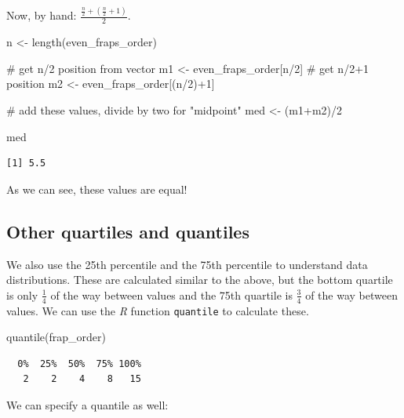 \documentclass[
  letterpaper,
  DIV=11,
  numbers=noendperiod]{scrreprt}
\newenvironment{Shaded}{\begin{snugshade}}{\end{snugshade}}
\newcommand{\CommentTok}[1]{\textcolor[rgb]{0.37,0.37,0.37}{#1}}
\newcommand{\DecValTok}[1]{\textcolor[rgb]{0.68,0.00,0.00}{#1}}
\newcommand{\FunctionTok}[1]{\textcolor[rgb]{0.28,0.35,0.67}{#1}}
\newcommand{\NormalTok}[1]{\textcolor[rgb]{0.00,0.23,0.31}{#1}}
\newcommand{\OtherTok}[1]{\textcolor[rgb]{0.00,0.23,0.31}{#1}}
\newcommand{\SpecialCharTok}[1]{\textcolor[rgb]{0.37,0.37,0.37}{#1}}
\begin{document}
Now, by hand: \(\frac{\frac{n}{2}+(\frac{n}{2}+1)}{2}\).

\begin{Shaded}
\begin{Highlighting}[]
\NormalTok{n }\OtherTok{\textless{}{-}} \FunctionTok{length}\NormalTok{(even\_fraps\_order)}

\CommentTok{\# get n/2 position from vector}
\NormalTok{m1 }\OtherTok{\textless{}{-}}\NormalTok{ even\_fraps\_order[n}\SpecialCharTok{/}\DecValTok{2}\NormalTok{]}
\CommentTok{\# get n/2+1 position}
\NormalTok{m2 }\OtherTok{\textless{}{-}}\NormalTok{ even\_fraps\_order[(n}\SpecialCharTok{/}\DecValTok{2}\NormalTok{)}\SpecialCharTok{+}\DecValTok{1}\NormalTok{]}

\CommentTok{\# add these values, divide by two for "midpoint"}
\NormalTok{med }\OtherTok{\textless{}{-}}\NormalTok{ (m1}\SpecialCharTok{+}\NormalTok{m2)}\SpecialCharTok{/}\DecValTok{2}

\NormalTok{med}
\end{Highlighting}
\end{Shaded}

\begin{verbatim}
[1] 5.5
\end{verbatim}

As we can see, these values are equal!

\subsection{Other quartiles and
quantiles}\label{other-quartiles-and-quantiles}

We also use the 25th percentile and the 75th percentile to understand
data distributions. These are calculated similar to the above, but the
bottom quartile is only \(\frac{1}{4}\) of the way between values and
the 75th quartile is \(\frac{3}{4}\) of the way between values. We can
use the \emph{R} function \texttt{quantile} to calculate these.

\begin{Shaded}
\begin{Highlighting}[]
\FunctionTok{quantile}\NormalTok{(frap\_order)}
\end{Highlighting}
\end{Shaded}

\begin{verbatim}
  0%  25%  50%  75% 100% 
   2    2    4    8   15 
\end{verbatim}

We can specify a quantile as well:
\end{document}
